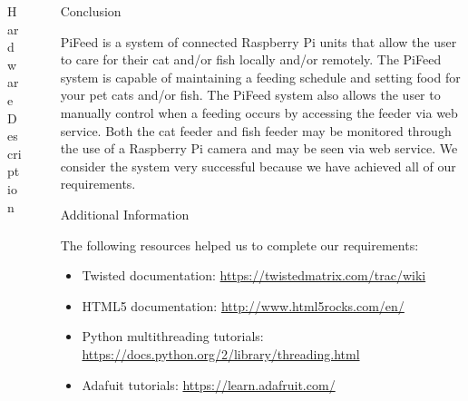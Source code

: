 \documentclass[final]{beamer}
\newlength{\sepwid}
\newlength{\onecolwid}
\newlength{\twocolwid}
\begin{document}
\begin{frame}[t]
\begin{columns}[t]
\begin{column}{\twocolwid}
\begin{columns}[t,totalwidth=\twocolwid]
\begin{column}{\onecolwid}
\begin{block}{Hardware Description}
\end{block}


\end{column} %

\end{columns} %

\end{column} %

\begin{column}{\sepwid}\end{column} %

\begin{column}{\onecolwid} %


\begin{block}{Conclusion}

PiFeed is a system of connected Raspberry Pi units that allow the user to care
for their cat and/or fish locally and/or remotely. The PiFeed system is capable
of maintaining a feeding schedule and setting food for your pet cats and/or
fish. The PiFeed system also allows the user to manually control when a feeding
occurs by accessing the feeder via web service. Both the cat feeder and fish
feeder may be monitored through the use of a Raspberry Pi camera and may be seen
via web service. We consider the system very successful because we have achieved
all of our requirements.

\end{block}


\begin{block}{Additional Information}

The following resources helped us to complete our requirements:
\begin{itemize}
\item Twisted documentation: \url{https://twistedmatrix.com/trac/wiki}
\item HTML5 documentation: \url{http://www.html5rocks.com/en/}
\item Python multithreading tutorials: \url{https://docs.python.org/2/library/threading.html}
\item Adafuit tutorials: \url{https://learn.adafruit.com/}
\end{itemize}


\end{block}
\end{column}
\end{columns}
\end{frame}
\end{document}
